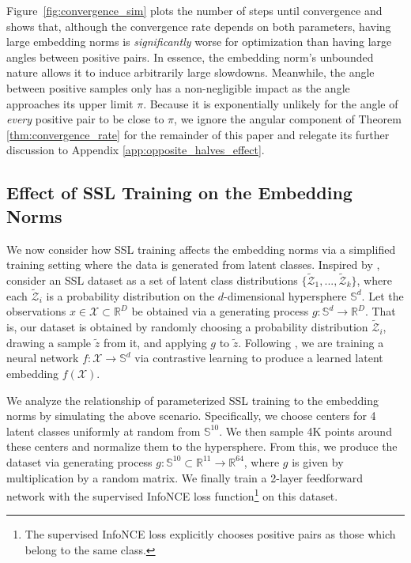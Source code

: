 Figure~\ref{fig:convergence_sim} plots the number of steps until convergence and shows that, although the convergence rate depends on both parameters,
having large embedding norms is \emph{significantly} worse for optimization than having large angles between
positive pairs. In essence, the embedding norm's unbounded nature allows it to induce arbitrarily large slowdowns. Meanwhile, the angle between positive samples only has a non-negligible impact as the angle approaches its upper limit $\pi$. Because it is exponentially unlikely for the angle of \emph{every} positive pair to be close to $\pi$, we ignore the angular component of Theorem \ref{thm:convergence_rate} for the remainder of this paper and relegate its further discussion to Appendix \ref{app:opposite_halves_effect}.

\subsection{Effect of SSL Training on the Embedding Norms}
\label{ssec:confidence_simulations}

We now consider how SSL training affects the embedding norms via a simplified training setting where the data is generated from latent classes. Inspired by \citet{latent_inversion, latent_inversion_2}, consider an SSL dataset as a set of latent class distributions $\{\tilde{\mathcal{Z}}_1, ..., \tilde{\mathcal{Z}}_k\}$, where each $\tilde{\mathcal{Z}}_i$ is a probability distribution on the $d$-dimensional hypersphere $\mathbb{S}^d$. Let the observations $x \in \mathcal{X} \subset \mathbb{R}^D$ be obtained via a generating process $g: \mathbb{S}^{d} \rightarrow \mathbb{R}^D$. That is, our dataset is obtained by randomly choosing a probability distribution $\tilde{\mathcal{Z}}_i$, drawing a sample $\tilde{z}$ from it, and applying $g$ to $\tilde{z}$.
Following \citet{latent_inversion, latent_inversion_2}, we are training a neural network $f: \mathcal{X} \to \mathbb{S}^{d}$ via contrastive learning to produce a learned latent embedding $ f(\mathcal{X})$. 

We analyze the relationship of parameterized SSL training to the embedding norms by simulating the above scenario. Specifically, we choose centers %
for 4 latent classes uniformly at random from $\mathbb{S}^{10}$. We then sample 4K points around these centers and normalize them to the hypersphere.
From this, we produce the dataset via generating process $g: \mathbb{S}^{10} \subset \mathbb{R}^{11} \rightarrow \mathbb{R}^{64}$, where $g$ is given by multiplication by a random matrix. We finally train a 2-layer feedforward network with the supervised InfoNCE loss function\footnote{The supervised InfoNCE loss explicitly chooses positive pairs as those which belong to the same class.} on this dataset.

